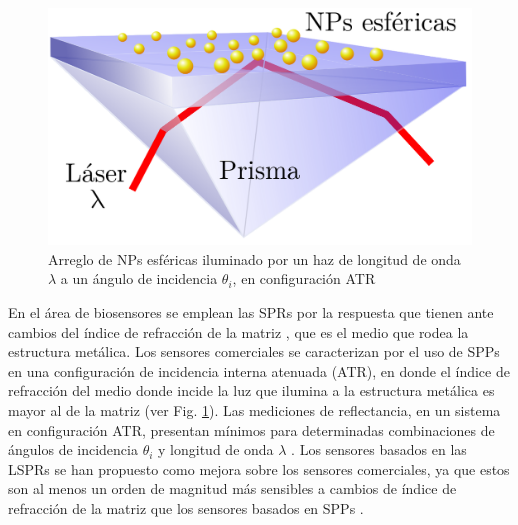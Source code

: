 \documentclass[letterpaper,11pt] {article}
\begin{document}
\begin{figure}\centering
	\includegraphics[scale=.18]{CSM_3D-Prism_Text.png}
	\caption{ Arreglo de NPs esf\'ericas iluminado por un haz de longitud de onda $\lambda$ a un \'angulo de incidencia $\theta_i$, en configuraci\'on ATR}
	\label{fig:ATR1}
\end{figure}

En el área de biosensores se emplean las SPRs por la respuesta que tienen ante cambios del índice de refracción de la matriz \cite{kabashin2009plasmonic}, que es el medio que rodea la estructura metálica.  Los sensores comerciales se caracterizan por el uso de SPPs en una configuración de incidencia interna atenuada (ATR), en donde el índice de refracción del medio donde incide la luz que ilumina a la estructura metálica es mayor al de la matriz (ver Fig.  \ref{fig:ATR1}).  Las mediciones de reflectancia, en un sistema en configuración ATR, presentan mínimos para determinadas combinaciones de  ángulos de incidencia $\theta_i$ y longitud de onda $\lambda$  \cite{danilov2018ultra}.  Los sensores basados en las LSPRs se han propuesto como mejora sobre los sensores comerciales, ya que estos son al menos un orden de magnitud más sensibles a cambios de índice de refracción de la matriz  que los sensores basados en SPPs \cite{jain2008noble,kabashin2009plasmonic}. 
\end{document}
